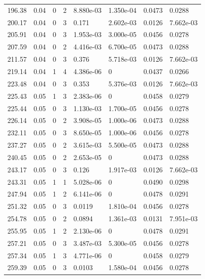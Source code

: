 \documentclass[preview]{standalone}
\begin{document}
{{{\begin{tabular}{L{1.2cm}C{1.2cm} C{0.3cm}C{0.5cm} C{1.4cm}C{1.4cm} C{1.4cm}C{1.4cm}}
  196.38  &  0.04  & 0     &  2 &  8.880e-03  & 1.350e-04  & 0.0473 &  0.0288   \\ 
  200.17  &  0.04  & 0     &  3 &  0.171  & 2.602e-03  & 0.0126 &  7.662e-03   \\ 
  205.91  &  0.04  & 0     &  3 &  1.953e-03  & 3.000e-05  & 0.0456 &  0.0278   \\ 
  207.59  &  0.04  & 0     &  2 &  4.416e-03  & 6.700e-05  & 0.0473 &  0.0288   \\ 
  211.57  &  0.04  & 0     &  3 &  0.376  & 5.718e-03  & 0.0126 &  7.662e-03   \\ 
  219.14  &  0.04  & 1     &  4 &  4.386e-06  & 0  & 0.0437 &  0.0266   \\ 
  223.48  &  0.04  & 0     &  3 &  0.353  & 5.376e-03  & 0.0126 &  7.662e-03   \\ 
  225.43  &  0.05  & 1     &  3 &  2.383e-06  & 0  & 0.0458 &  0.0279   \\ 
  225.44  &  0.05  & 0     &  3 &  1.130e-03  & 1.700e-05  & 0.0456 &  0.0278   \\ 
  226.14  &  0.05  & 0     &  2 &  3.908e-05  & 1.000e-06  & 0.0473 &  0.0288   \\ 
  232.11  &  0.05  & 0     &  3 &  8.650e-05  & 1.000e-06  & 0.0456 &  0.0278   \\ 
  237.27  &  0.05  & 0     &  2 &  3.615e-03  & 5.500e-05  & 0.0473 &  0.0288   \\ 
  240.45  &  0.05  & 0     &  2 &  2.653e-05  & 0  & 0.0473 &  0.0288   \\ 
  243.17  &  0.05  & 0     &  3 &  0.126  & 1.917e-03  & 0.0126 &  7.662e-03   \\ 
  243.31  &  0.05  & 1     &  1 &  5.028e-06  & 0  & 0.0490 &  0.0298   \\ 
  247.94  &  0.05  & 1     &  2 &  6.141e-06  & 0  & 0.0478 &  0.0291   \\ 
  251.32  &  0.05  & 0     &  3 &  0.0119  & 1.810e-04  & 0.0456 &  0.0278   \\ 
  254.78  &  0.05  & 0     &  2 &  0.0894  & 1.361e-03  & 0.0131 &  7.951e-03   \\ 
  255.95  &  0.05  & 1     &  2 &  2.130e-06  & 0  & 0.0478 &  0.0291   \\ 
  257.21  &  0.05  & 0     &  3 &  3.487e-03  & 5.300e-05  & 0.0456 &  0.0278   \\ 
  257.34  &  0.05  & 1     &  3 &  4.771e-06  & 0  & 0.0458 &  0.0279   \\ 
  259.39  &  0.05  & 0     &  3 &  0.0103  & 1.580e-04  & 0.0456 &  0.0278   \\ 

\end{tabular}}}}
\end{document}
